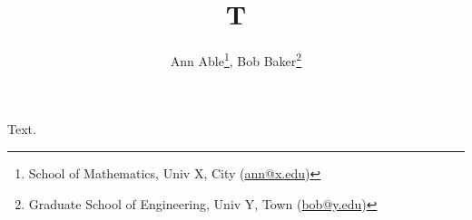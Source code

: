 \documentclass{article}
\begin{document}
\title{T}
\author{Ann Able\thanks{School of Mathematics, Univ X, City (\url{ann@x.edu})},
Bob Baker\thanks{Graduate School of Engineering, Univ Y, Town (\url{bob@y.edu})}}
\maketitle
Text.
\end{document}
